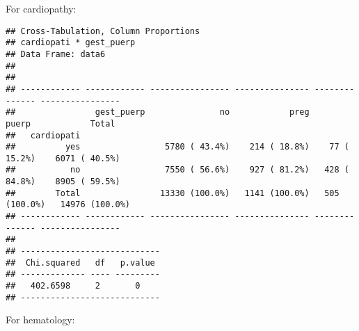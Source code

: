 \documentclass[
]{article}
\newenvironment{Shaded}{\begin{snugshade}}{\end{snugshade}}
\newcommand{\DataTypeTok}[1]{\textcolor[rgb]{0.13,0.29,0.53}{#1}}
\newcommand{\KeywordTok}[1]{\textcolor[rgb]{0.13,0.29,0.53}{\textbf{#1}}}
\newcommand{\NormalTok}[1]{#1}
\newcommand{\OperatorTok}[1]{\textcolor[rgb]{0.81,0.36,0.00}{\textbf{#1}}}
\newcommand{\OtherTok}[1]{\textcolor[rgb]{0.56,0.35,0.01}{#1}}
\newcommand{\StringTok}[1]{\textcolor[rgb]{0.31,0.60,0.02}{#1}}
\begin{document}
For cardiopathy:

\begin{Shaded}
\end{Shaded}

\begin{verbatim}
## Cross-Tabulation, Column Proportions  
## cardiopati * gest_puerp  
## Data Frame: data6  
## 
## 
## ------------ ------------ ---------------- --------------- -------------- ----------------
##                gest_puerp               no            preg          puerp            Total
##   cardiopati                                                                              
##          yes                 5780 ( 43.4%)    214 ( 18.8%)    77 ( 15.2%)    6071 ( 40.5%)
##           no                 7550 ( 56.6%)    927 ( 81.2%)   428 ( 84.8%)    8905 ( 59.5%)
##        Total                13330 (100.0%)   1141 (100.0%)   505 (100.0%)   14976 (100.0%)
## ------------ ------------ ---------------- --------------- -------------- ----------------
## 
## ----------------------------
##  Chi.squared   df   p.value 
## ------------- ---- ---------
##   402.6598     2       0    
## ----------------------------
\end{verbatim}

For hematology:

\begin{Shaded}
\end{Shaded}
\end{document}
